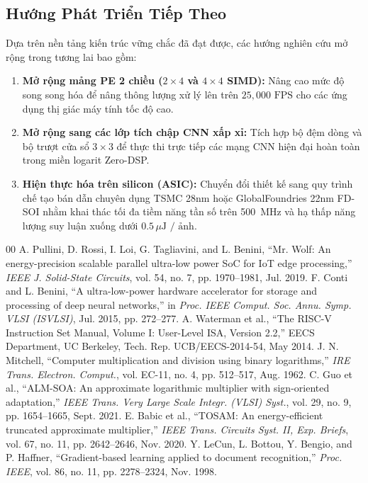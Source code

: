 \documentclass[conference]{IEEEtran}
\begin{document}
\subsection{Hướng Phát Triển Tiếp Theo}
\hspace*{1em} Dựa trên nền tảng kiến trúc vững chắc đã đạt được, các hướng nghiên cứu mở rộng trong tương lai bao gồm:
\begin{enumerate}
    \item \textbf{Mở rộng mảng PE 2 chiều ($2\times 4$ và $4\times 4$ SIMD):} Nâng cao mức độ song song hóa để nâng thông lượng xử lý lên trên $25,000\text{ FPS}$ cho các ứng dụng thị giác máy tính tốc độ cao.
    \item \textbf{Mở rộng sang các lớp tích chập CNN xấp xỉ:} Tích hợp bộ đệm dòng và bộ trượt cửa sổ $3\times 3$ để thực thi trực tiếp các mạng CNN hiện đại hoàn toàn trong miền logarit Zero-DSP.
    \item \textbf{Hiện thực hóa trên silicon (ASIC):} Chuyển đổi thiết kế sang quy trình chế tạo bán dẫn chuyên dụng TSMC 28nm hoặc GlobalFoundries 22nm FD-SOI nhằm khai thác tối đa tiềm năng tần số trên 500~MHz và hạ thấp năng lượng suy luận xuống dưới $0.5\,\mu\text{J / ảnh}$.
\end{enumerate}

\renewcommand{\IEEEbibitemsep}{1.8pt plus 0.5pt}
{\footnotesize

\begin{thebibliography}{00}
 A. Pullini, D. Rossi, I. Loi, G. Tagliavini, and L. Benini, ``Mr. Wolf: An energy-precision scalable parallel ultra-low power SoC for IoT edge processing,'' \textit{IEEE J. Solid-State Circuits}, vol. 54, no. 7, pp. 1970--1981, Jul. 2019.
 F. Conti and L. Benini, ``A ultra-low-power hardware accelerator for storage and processing of deep neural networks,'' in \textit{Proc. IEEE Comput. Soc. Annu. Symp. VLSI (ISVLSI)}, Jul. 2015, pp. 272--277.
 A. Waterman et al., ``The RISC-V Instruction Set Manual, Volume I: User-Level ISA, Version 2.2,'' EECS Department, UC Berkeley, Tech. Rep. UCB/EECS-2014-54, May 2014.
 J. N. Mitchell, ``Computer multiplication and division using binary logarithms,'' \textit{IRE Trans. Electron. Comput.}, vol. EC-11, no. 4, pp. 512--517, Aug. 1962.
 C. Guo et al., ``ALM-SOA: An approximate logarithmic multiplier with sign-oriented adaptation,'' \textit{IEEE Trans. Very Large Scale Integr. (VLSI) Syst.}, vol. 29, no. 9, pp. 1654--1665, Sept. 2021.
 E. Babic et al., ``TOSAM: An energy-efficient truncated approximate multiplier,'' \textit{IEEE Trans. Circuits Syst. II, Exp. Briefs}, vol. 67, no. 11, pp. 2642--2646, Nov. 2020.
 Y. LeCun, L. Bottou, Y. Bengio, and P. Haffner, ``Gradient-based learning applied to document recognition,'' \textit{Proc. IEEE}, vol. 86, no. 11, pp. 2278--2324, Nov. 1998.
\end{thebibliography}
}
\end{document}
